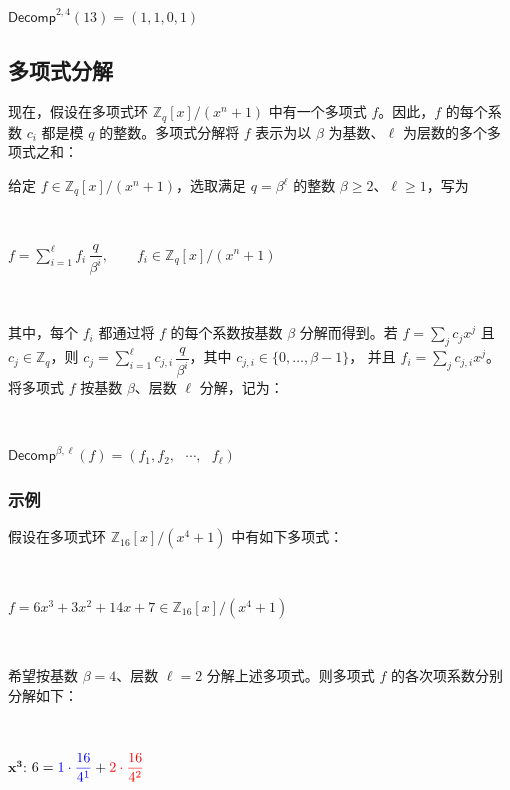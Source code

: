 $ $

$\textsf{Decomp}^{2, 4}(13) = (1, 1, 0, 1)$


\subsection{多项式分解}
\label{subsec:poly-decomp}

现在，假设在多项式环 ${\mathbb{Z}_q[x] / (x^n + 1)}$ 中有一个多项式 $f$。因此，$f$ 的每个系数 $c_i$ 都是模 $q$ 的整数。多项式分解将 $f$ 表示为以 $\beta$ 为基数、$\ell$ 为层数的多个多项式之和：


\begin{tcolorbox}[title={\textbf{\tboxlabel{\ref*{subsec:poly-decomp}} 多项式分解}}]

给定 $f\in \mathbb{Z}_q[x]/(x^n+1)$，选取满足 $q=\beta^\ell$ 的整数 $\beta\ge2$、$\ell\ge1$，写为

$ $

$
f=\sum\limits_{i=1}^{\ell} f_i\,\dfrac{q}{\beta^i}, \qquad f_i\in \mathbb{Z}_q[x]/(x^n+1)
$

$ $

其中，每个 $f_i$ 都通过将 $f$ 的每个系数按基数 $\beta$ 分解而得到。若 $f=\sum\limits_j c_j x^j$ 且 $c_j\in\mathbb{Z}_q$，则
$c_j=\sum\limits_{i=1}^{\ell} c_{j,i}\,\dfrac{q}{\beta^i}$，其中 $c_{j,i}\in\{0,\ldots,\beta-1\}$，
并且 $f_i=\sum_j c_{j,i} x^j$。
将多项式 $f$ 按基数 $\beta$、层数 $\ell$ 分解，记为：

$ $

$\textsf{Decomp}^{\beta, \ell}(f) = (f_1, f_2, \text{ } \cdots , \text{ } f_\ell)$
 $ $
\end{tcolorbox}




\subsubsection{示例}

假设在多项式环 $\mathbb{Z}_{16}[x] / (x^4 + 1)$ 中有如下多项式：

$ $

$f = 6x^3 + 3x^2 + 14x + 7 \in \mathbb{Z}_{16}[x] / (x^4 + 1)$

$ $

希望按基数 $\beta = 4$、层数 $\ell = 2$ 分解上述多项式。则多项式 $f$ 的各次项系数分别分解如下：

$ $

${\bm{x}^{\bm{3}}}$: $6 = \color{blue}{1 \cdot \dfrac{16}{4^1}} \color{black}+ \color{red}{2 \cdot \dfrac{16}{4^2}}$

